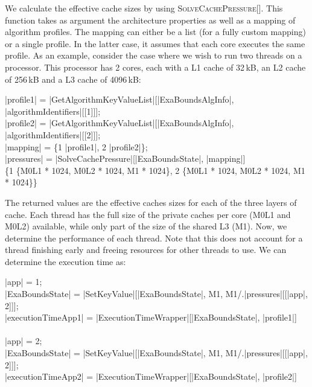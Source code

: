 We calculate the effective cache sizes by using \textsc{SolveCachePressure[]}. This function takes as argument the architecture properties as well as a mapping of algorithm profiles. The mapping can either be a list (for a fully custom mapping) or a single profile. In the latter case, it assumes that each core executes the same profile. As an example, consider the case where we wish to run two threads on a processor. This processor has 2 cores, each with a L1 cache of 32\,kB, an L2 cache of 256\,kB and a L3 cache of 4096\,kB:
\begin{mma}
 \In |profile1| = |GetAlgorithmKeyValueList|[|ExaBoundsAlgInfo|, \linebreak|algorithmIdentifiers|[[1]]]; \\
 \In |profile2| = |GetAlgorithmKeyValueList|[|ExaBoundsAlgInfo|, \linebreak|algorithmIdentifiers|[[2]]]; \\
 \In |mapping| = \{1 \rightarrow |profile1|, 2 \rightarrow |profile2|\}; \\
 \In |pressures| = |SolveCachePressure|[|ExaBoundsState|, |mapping|] \\
 \Out \{1 \rightarrow \{M0L1  * 1024, M0L2  * 1024, M1  * 1024\}, 2 \rightarrow \{M0L1  * 1024, M0L2  * 1024,  M1  * 1024\}\} \\
\end{mma}

The returned values are the effective caches sizes for each of the three layers of cache. Each thread has the full size of the private caches per core (\textsc{M0L1} and \textsc{M0L2}) available, while only part of the size of the shared L3 (\textsc{M1}). Now, we determine the performance of each thread. Note that this does not account for a thread finishing early and freeing resources for other threads to use. We can determine the execution time as:
\filbreak\begin{mma}
 \In |app| = 1; \\
 \In |ExaBoundsState| = |SetKeyValue|[|ExaBoundsState|, M1, \linebreak{}M1\!/.\!|pressures|[[|app|, 2]]]; \\
 \In |executionTimeApp1| =  \linebreak|ExecutionTimeWrapper|[|ExaBoundsState|, |profile1|] \\
  \\
 \In |app| = 2; \\
 \In |ExaBoundsState| = |SetKeyValue|[|ExaBoundsState|, M1, \linebreak{}M1\!/.\!|pressures|[[|app|, 2]]]; \\
 \In |executionTimeApp2| =  \linebreak|ExecutionTimeWrapper|[|ExaBoundsState|, |profile2|] \\
  \\
\end{mma}

